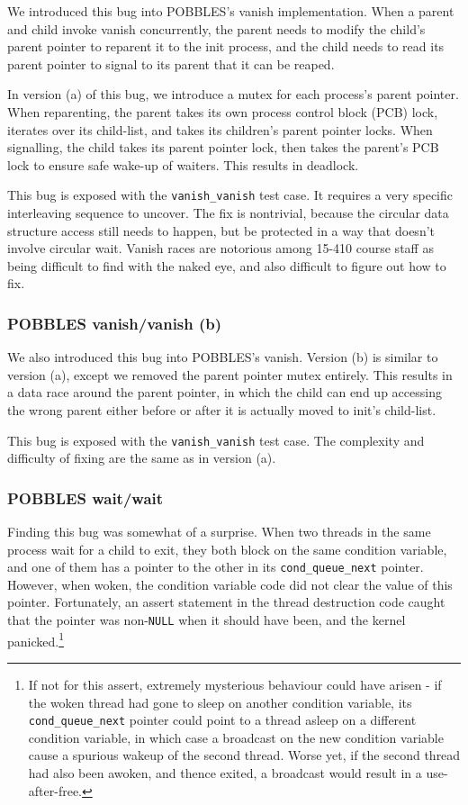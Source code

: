 We introduced this bug into POBBLES's vanish implementation. When a parent and child invoke vanish concurrently, the parent needs to modify the child's parent pointer to reparent it to the init process, and the child needs to read its parent pointer to signal to its parent that it can be reaped.

In version (a) of this bug, we introduce a mutex for each process's parent pointer. When reparenting, the parent takes its own process control block (PCB) lock, iterates over its child-list, and takes its children's parent pointer locks. When signalling, the child takes its parent pointer lock, then takes the parent's PCB lock to ensure safe wake-up of waiters. This results in deadlock.

This bug is exposed with the \texttt{vanish\_vanish} test case. It requires a very specific interleaving sequence to uncover.
The fix is nontrivial, because the circular data structure access still needs to happen, but be protected in a way that doesn't involve circular wait.
Vanish races are notorious among 15-410 course staff as being difficult to find with the naked eye, and also difficult to figure out how to fix.

\subsubsection{POBBLES vanish/vanish (b)}

We also introduced this bug into POBBLES's vanish. Version (b) is similar to version (a), except we removed the parent pointer mutex entirely. This results in a data race around the parent pointer, in which the child can end up accessing the wrong parent either before or after it is actually moved to init's child-list.

This bug is exposed with the \texttt{vanish\_vanish} test case. The complexity and difficulty of fixing are the same as in version (a).

\subsubsection{POBBLES wait/wait}

Finding this bug was somewhat of a surprise. When two threads in the same process wait for a child to exit, they both block on the same condition variable, and one of them has a pointer to the other in its \texttt{cond\_queue\_next} pointer. However, when woken, the condition variable code did not clear the value of this pointer. Fortunately, an assert statement in the thread destruction code caught that the pointer was non-\texttt{NULL} when it should have been, and the kernel panicked.\footnote{
If not for this assert, extremely mysterious behaviour could have arisen - if the woken thread had gone to sleep on another condition variable, its \texttt{cond\_queue\_next} pointer could point to a thread asleep on a different condition variable, in which case a broadcast on the new condition variable cause a spurious wakeup of the second thread. Worse yet, if the second thread had also been awoken, and thence exited, a broadcast would result in a use-after-free.}

